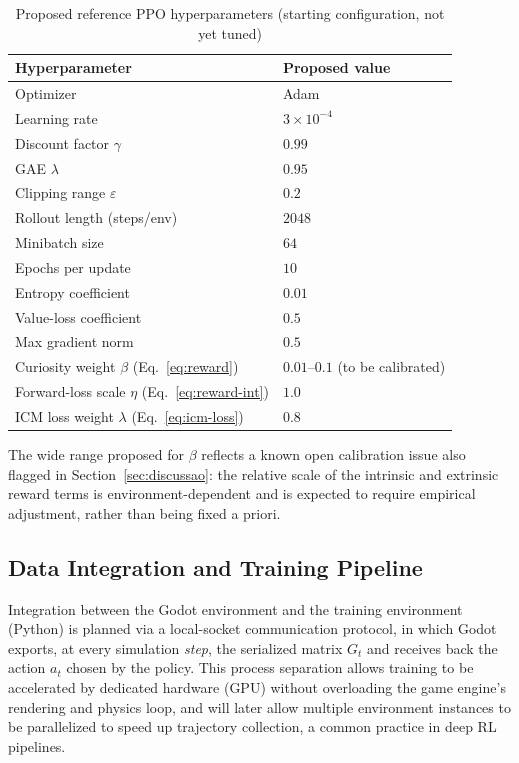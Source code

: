 \documentclass[sigconf,nonacm,language=english]{acmart}
\begin{document}
\begin{table}
  \caption{Proposed reference PPO hyperparameters (starting configuration,
    not yet tuned)}
  \label{tab:ppo-hparams}
  \begin{tabular}{ll}
    \toprule
    \textbf{Hyperparameter} & \textbf{Proposed value} \\
    \midrule
    Optimizer & Adam \\
    Learning rate & $3\times 10^{-4}$ \\
    Discount factor $\gamma$ & $0.99$ \\
    GAE $\lambda$ & $0.95$ \\
    Clipping range $\varepsilon$ & $0.2$ \\
    Rollout length (steps/env) & $2048$ \\
    Minibatch size & $64$ \\
    Epochs per update & $10$ \\
    Entropy coefficient & $0.01$ \\
    Value-loss coefficient & $0.5$ \\
    Max gradient norm & $0.5$ \\
    Curiosity weight $\beta$ (Eq.~\eqref{eq:reward}) & $0.01$--$0.1$ (to be calibrated) \\
    Forward-loss scale $\eta$ (Eq.~\eqref{eq:reward-int}) & $1.0$ \\
    ICM loss weight $\lambda$ (Eq.~\eqref{eq:icm-loss}) & $0.8$ \\
    \bottomrule
  \end{tabular}
\end{table}

The wide range proposed for $\beta$ reflects a known open calibration issue
also flagged in Section~\ref{sec:discussao}: the relative scale of the
intrinsic and extrinsic reward terms is environment-dependent and is
expected to require empirical adjustment, rather than being fixed a
priori.

\subsection{Data Integration and Training Pipeline}

Integration between the Godot environment and the training environment
(Python) is planned via a local-socket communication protocol, in which
Godot exports, at every simulation \emph{step}, the serialized matrix $G_t$
and receives back the action $a_t$ chosen by the policy. This process
separation allows training to be accelerated by dedicated hardware (GPU)
without overloading the game engine's rendering and physics loop, and will
later allow multiple environment instances to be parallelized to speed up
trajectory collection, a common practice in deep RL pipelines.
\end{document}
